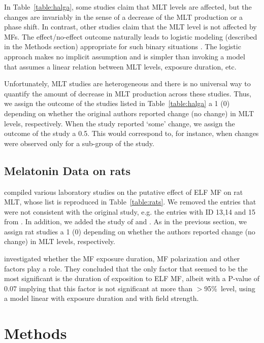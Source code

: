 \documentclass[letter,twoside]{article}
\begin{document}
In Table~\ref{table:halga}, some studies claim that MLT levels are affected, but the changes are invariably in the sense of a decrease of the MLT production or a phase shift.
In contrast, other studies claim that the MLT level is not affected by MFs.  The effect/no-effect outcome naturally leads to 
 logistic modeling (described in the Methods section) appropriate for such binary situations   \citep{Hosmer2000}. The logistic approach makes no implicit assumption and is simpler than invoking a model that assumes a linear relation between MLT levels, exposure duration, etc.

 Unfortunately, MLT studies are heterogeneous and there is no universal way to quantify the amount of decrease in MLT production across these studies. Thus,  we assign the outcome of the studies listed in Table~\ref{table:halga} a 1 (0) depending on whether the original authors reported change (no change)  in MLT levels, respectively. When the study reported `some' change, we assign the outcome of the study a 0.5. This would correspond to, for instance, when changes were observed only for a sub-group of the study.


\subsection*{Melatonin Data on rats}
\label{section:rats}
 
\citet{Jahandideh2010} compiled various laboratory studies on the putative effect of ELF MF  on rat MLT,
whose list is reproduced in  Table~\ref{table:rats}. 
We  removed the entries that were not consistent with the original study, e.g. the entries with ID 13,14 and 15 from \citet{John1998}.
In addition, we added the study of \citet{Loscher1994} and \citet{Loscher1998}.
As in the previous section, we assign rat studies a 1 (0) depending on whether the authors reported change (no change)  in  MLT levels, respectively.

\citet{Jahandideh2010} investigated whether the MF exposure duration, MF polarization and other factors play a role. They concluded that the only factor that seemed to be the most significant is the duration of exposition to ELF MF, albeit with a  P-value of 0.07 implying that this factor is not significant at more than $>$95\%\ level, using a model linear with exposure duration and with field strength.



\section*{Methods}
\end{document}

